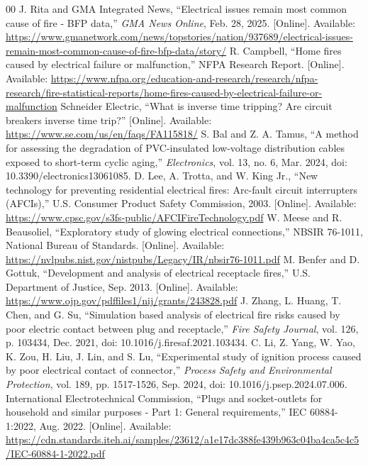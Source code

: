 \documentclass[conference,a4paper]{template/IEEEtran}
\begin{document}
\begin{thebibliography}{00}
 J. Rita and GMA Integrated News, ``Electrical issues remain most common cause of fire - BFP data,'' \textit{GMA News Online}, Feb. 28, 2025. [Online]. Available: \url{https://www.gmanetwork.com/news/topstories/nation/937689/electrical-issues-remain-most-common-cause-of-fire-bfp-data/story/}
 R. Campbell, ``Home fires caused by electrical failure or malfunction,'' NFPA Research Report. [Online]. Available: \url{https://www.nfpa.org/education-and-research/research/nfpa-research/fire-statistical-reports/home-fires-caused-by-electrical-failure-or-malfunction}
 Schneider Electric, ``What is inverse time tripping? Are circuit breakers inverse time trip?'' [Online]. Available: \url{https://www.se.com/us/en/faqs/FA115818/}
 S. Bal and Z. A. Tamus, ``A method for assessing the degradation of PVC-insulated low-voltage distribution cables exposed to short-term cyclic aging,'' \textit{Electronics}, vol. 13, no. 6, Mar. 2024, doi: 10.3390/electronics13061085.
 D. Lee, A. Trotta, and W. King Jr., ``New technology for preventing residential electrical fires: Arc-fault circuit interrupters (AFCIs),'' U.S. Consumer Product Safety Commission, 2003. [Online]. Available: \url{https://www.cpsc.gov/s3fs-public/AFCIFireTechnology.pdf}
 W. Meese and R. Beausoliel, ``Exploratory study of glowing electrical connections,'' NBSIR 76-1011, National Bureau of Standards. [Online]. Available: \url{https://nvlpubs.nist.gov/nistpubs/Legacy/IR/nbsir76-1011.pdf}
 M. Benfer and D. Gottuk, ``Development and analysis of electrical receptacle fires,'' U.S. Department of Justice, Sep. 2013. [Online]. Available: \url{https://www.ojp.gov/pdffiles1/nij/grants/243828.pdf}
 J. Zhang, L. Huang, T. Chen, and G. Su, ``Simulation based analysis of electrical fire risks caused by poor electric contact between plug and receptacle,'' \textit{Fire Safety Journal}, vol. 126, p. 103434, Dec. 2021, doi: 10.1016/j.firesaf.2021.103434.
 C. Li, Z. Yang, W. Yao, K. Zou, H. Liu, J. Lin, and S. Lu, ``Experimental study of ignition process caused by poor electrical contact of connector,'' \textit{Process Safety and Environmental Protection}, vol. 189, pp. 1517-1526, Sep. 2024, doi: 10.1016/j.psep.2024.07.006.
 International Electrotechnical Commission, ``Plugs and socket-outlets for household and similar purposes - Part 1: General requirements,'' IEC 60884-1:2022, Aug. 2022. [Online]. Available: \url{https://cdn.standards.iteh.ai/samples/23612/a1e17dc388fe439b963c04ba4ca5c4c5/IEC-60884-1-2022.pdf}

\end{thebibliography}
\end{document}
